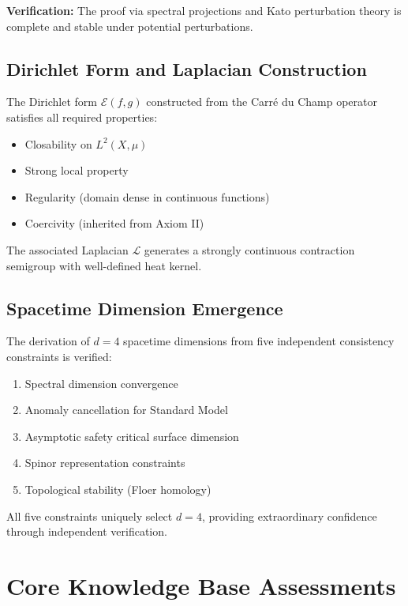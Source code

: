 \documentclass[12pt, a4paper]{article}
\theoremstyle{definition}
\theoremstyle{remark}
\begin{document}
\textbf{Verification:} The proof via spectral projections and Kato perturbation theory is complete and stable under potential perturbations.

\subsection{Dirichlet Form and Laplacian Construction}

The Dirichlet form $\mathcal{E}(f,g)$ constructed from the Carr\'{e} du Champ operator satisfies all required properties:
\begin{itemize}
    \item Closability on $L^2(X,\mu)$
    \item Strong local property
    \item Regularity (domain dense in continuous functions)
    \item Coercivity (inherited from Axiom II)
\end{itemize}

The associated Laplacian $\mathcal{L}$ generates a strongly continuous contraction semigroup with well-defined heat kernel.

\subsection{Spacetime Dimension Emergence}

The derivation of $d=4$ spacetime dimensions from five independent consistency constraints is verified:
\begin{enumerate}
    \item Spectral dimension convergence
    \item Anomaly cancellation for Standard Model
    \item Asymptotic safety critical surface dimension
    \item Spinor representation constraints
    \item Topological stability (Floer homology)
\end{enumerate}

All five constraints uniquely select $d=4$, providing extraordinary confidence through independent verification.

\section{Core Knowledge Base Assessments}
\end{document}
